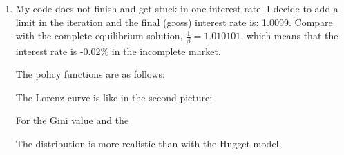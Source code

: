 \documentclass[12pt]{article}%
\begin{document}
\begin{enumerate}
	\item My code does not finish and get stuck in one interest rate. I decide to add a limit in the iteration and the final (gross) interest rate is: 1.0099. Compare with the complete equilibrium solution, $\frac{1}{\beta}=1.010101$, which means that the interest rate is -0.02\% in the incomplete market. 
	
	The policy functions are as follows:
	
	The Lorenz curve is like in the second picture:
	
	For the Gini value and the 
	
	The distribution is more realistic than with the Hugget model. 
	
	
\end{enumerate}

\strut

\onehalfspacing
\end{document}
